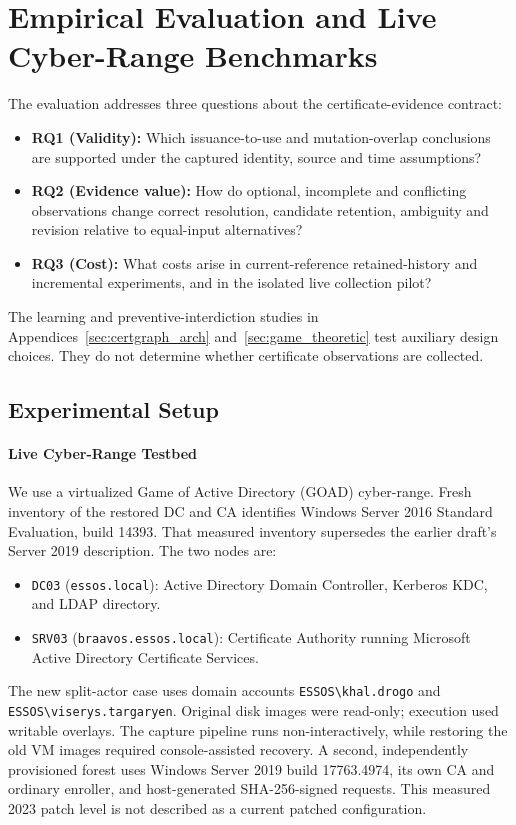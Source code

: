 \section{Empirical Evaluation and Live Cyber-Range Benchmarks}
\label{sec:evaluation}

The evaluation addresses three questions about the certificate-evidence contract:
\begin{itemize}
\item \textbf{RQ1 (Validity):} Which issuance-to-use and mutation-overlap conclusions are supported under the captured identity, source and time assumptions?
\item \textbf{RQ2 (Evidence value):} How do optional, incomplete and conflicting observations change correct resolution, candidate retention, ambiguity and revision relative to equal-input alternatives?
\item \textbf{RQ3 (Cost):} What costs arise in current-reference retained-history and incremental experiments, and in the isolated live collection pilot?
\end{itemize}
The learning and preventive-interdiction studies in Appendices~\ref{sec:certgraph_arch} and~\ref{sec:game_theoretic} test auxiliary design choices. They do not determine whether certificate observations are collected.

\subsection{Experimental Setup}
\paragraph{Live Cyber-Range Testbed} We use a virtualized Game of Active Directory (GOAD) cyber-range. Fresh inventory of the restored DC and CA identifies Windows Server 2016 Standard Evaluation, build 14393. That measured inventory supersedes the earlier draft's Server 2019 description. The two nodes are:
\begin{itemize}
    \item \texttt{DC03} (\texttt{essos.local}): Active Directory Domain Controller, Kerberos KDC, and LDAP directory.
    \item \texttt{SRV03} (\texttt{braavos.essos.local}): Certificate Authority running Microsoft Active Directory Certificate Services.
\end{itemize}
The new split-actor case uses domain accounts \texttt{ESSOS\textbackslash khal.drogo} and \texttt{ESSOS\textbackslash viserys.targaryen}. Original disk images were read-only; execution used writable overlays. The capture pipeline runs non-interactively, while restoring the old VM images required console-assisted recovery. A second, independently provisioned forest uses Windows Server 2019 build 17763.4974, its own CA and ordinary enroller, and host-generated SHA-256-signed requests. This measured 2023 patch level is not described as a current patched configuration.

